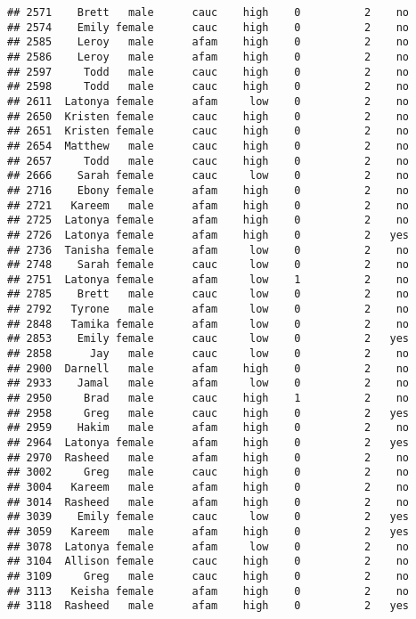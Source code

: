 \documentclass[
]{article}
\begin{document}
\begin{verbatim}
## 2571    Brett   male      cauc    high    0          2    no
## 2574    Emily female      cauc    high    0          2    no
## 2585    Leroy   male      afam    high    0          2    no
## 2586    Leroy   male      afam    high    0          2    no
## 2597     Todd   male      cauc    high    0          2    no
## 2598     Todd   male      cauc    high    0          2    no
## 2611  Latonya female      afam     low    0          2    no
## 2650  Kristen female      cauc    high    0          2    no
## 2651  Kristen female      cauc    high    0          2    no
## 2654  Matthew   male      cauc    high    0          2    no
## 2657     Todd   male      cauc    high    0          2    no
## 2666    Sarah female      cauc     low    0          2    no
## 2716    Ebony female      afam    high    0          2    no
## 2721   Kareem   male      afam    high    0          2    no
## 2725  Latonya female      afam    high    0          2    no
## 2726  Latonya female      afam    high    0          2   yes
## 2736  Tanisha female      afam     low    0          2    no
## 2748    Sarah female      cauc     low    0          2    no
## 2751  Latonya female      afam     low    1          2    no
## 2785    Brett   male      cauc     low    0          2    no
## 2792   Tyrone   male      afam     low    0          2    no
## 2848   Tamika female      afam     low    0          2    no
## 2853    Emily female      cauc     low    0          2   yes
## 2858      Jay   male      cauc     low    0          2    no
## 2900  Darnell   male      afam    high    0          2    no
## 2933    Jamal   male      afam     low    0          2    no
## 2950     Brad   male      cauc    high    1          2    no
## 2958     Greg   male      cauc    high    0          2   yes
## 2959    Hakim   male      afam    high    0          2    no
## 2964  Latonya female      afam    high    0          2   yes
## 2970  Rasheed   male      afam    high    0          2    no
## 3002     Greg   male      cauc    high    0          2    no
## 3004   Kareem   male      afam    high    0          2    no
## 3014  Rasheed   male      afam    high    0          2    no
## 3039    Emily female      cauc     low    0          2   yes
## 3059   Kareem   male      afam    high    0          2   yes
## 3078  Latonya female      afam     low    0          2    no
## 3104  Allison female      cauc    high    0          2    no
## 3109     Greg   male      cauc    high    0          2    no
## 3113   Keisha female      afam    high    0          2    no
## 3118  Rasheed   male      afam    high    0          2   yes

\end{verbatim}
\end{document}

